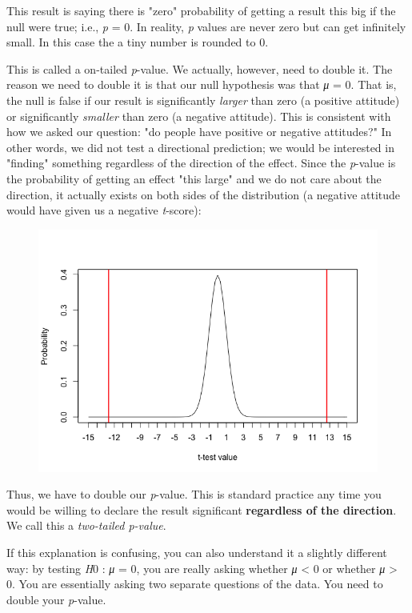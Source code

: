 \documentclass[11pt]{article}
\makeatletter
\def\maxwidth{\ifdim\Gin@nat@width>\linewidth\linewidth
    \else\Gin@nat@width\fi}
\let\Oldincludegraphics\includegraphics
\renewcommand{\includegraphics}[1]{\Oldincludegraphics[width=.8\maxwidth]{#1}}
\makeatother
\begin{document}
    This result is saying there is "zero" probability of getting a result
this big if the null were true; i.e., \emph{p} = 0. In reality, \emph{p}
values are never zero but can get infinitely small. In this case the a
tiny number is rounded to 0.

This is called a on-tailed \emph{p}-value. We actually, however, need to
double it. The reason we need to double it is that our null hypothesis
was that \emph{μ} = 0. That is, the null is false if our result is
significantly \emph{larger} than zero (a positive attitude) or
significantly \emph{smaller} than zero (a negative attitude). This is
consistent with how we asked our question: "do people have positive or
negative attitudes?" In other words, we did not test a directional
prediction; we would be interested in "finding" something regardless of
the direction of the effect. Since the \emph{p}-value is the probability
of getting an effect "this large" and we do not care about the
direction, it actually exists on both sides of the distribution (a
negative attitude would have given us a negative \emph{t}-score):

\begin{figure}
\centering
\includegraphics{img/unnamed-chunk-11-1.png}
\caption{}
\end{figure}

Thus, we have to double our \emph{p}-value. This is standard practice
any time you would be willing to declare the result significant
\textbf{regardless of the direction}. We call this a \emph{two-tailed
p-value}.

If this explanation is confusing, you can also understand it a slightly
different way: by testing \emph{H}0 : \emph{μ} = 0, you are really
asking whether \emph{μ} \textless{} 0 or whether
\emph{μ} \textgreater{} 0. You are essentially asking two separate
questions of the data. You need to double your \emph{p}-value.
\end{document}
